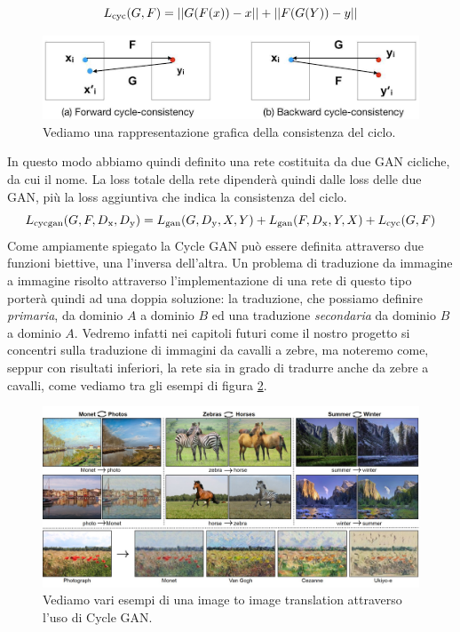 $$L\textsubscript{cyc}(G,F) = ||G(F(x))-x|| + ||F(G(Y))-y||$$

\begin{figure}[H]
  \begin{center}
    \includegraphics[width=0.8\columnwidth]{images/cycle consistency.png}
  \end{center}
  \caption{Vediamo una rappresentazione grafica della consistenza del ciclo.}
  \label{fig:Cycle Consistency}
\end{figure}
In questo modo abbiamo quindi definito una rete costituita da due GAN cicliche, da cui il nome. La loss totale della rete dipenderà quindi dalle loss delle due GAN, più la loss aggiuntiva che indica la consistenza del ciclo.
$$L\textsubscript{cycgan}(G,F,D\textsubscript{x},D\textsubscript{y})=
L\textsubscript{gan}(G,D\textsubscript{y},X,Y) +
L\textsubscript{gan}(F,D\textsubscript{x},Y,X) + 
L\textsubscript{cyc}(G,F)
$$
Come ampiamente spiegato la Cycle GAN può essere definita attraverso due funzioni biettive, una l'inversa dell'altra. Un problema di traduzione da immagine a immagine risolto attraverso l'implementazione di una rete di questo tipo porterà quindi ad una doppia soluzione: la traduzione, che possiamo definire \emph{primaria}, da dominio $A$ a dominio $B$ ed una traduzione \emph{secondaria} da dominio $B$ a dominio $A$.
Vedremo infatti nei capitoli futuri come il nostro progetto si concentri sulla traduzione di immagini da cavalli a zebre, ma noteremo come, seppur con risultati inferiori, la rete sia in grado di tradurre anche da zebre a cavalli, come vediamo tra gli esempi di figura \ref{fig:Cycle GAN Example}.

\begin{figure}[H]
  \begin{center}
    \includegraphics[width=1\columnwidth]{images/cycle gan example.jpg}
  \end{center}
  \caption{Vediamo vari esempi di una image to image translation attraverso l'uso di Cycle GAN.}
  \label{fig:Cycle GAN Example}
\end{figure}

